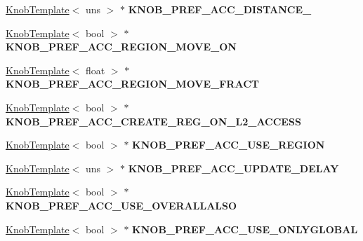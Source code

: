 \begin{DoxyCompactItemize}
\item 
\hypertarget{classall__knobs__c_acaf4e18cdefbbba18ee13f93cdf1183a}{
\hyperlink{classKnobTemplate}{KnobTemplate}$<$ uns $>$ $\ast$ {\bfseries KNOB\_\-PREF\_\-ACC\_\-DISTANCE\_}}
\label{classall__knobs__c_acaf4e18cdefbbba18ee13f93cdf1183a}

\item 
\hypertarget{classall__knobs__c_a97ea3ca4625d5f82c295c829c79321f5}{
\hyperlink{classKnobTemplate}{KnobTemplate}$<$ bool $>$ $\ast$ {\bfseries KNOB\_\-PREF\_\-ACC\_\-REGION\_\-MOVE\_\-ON}}
\label{classall__knobs__c_a97ea3ca4625d5f82c295c829c79321f5}

\item 
\hypertarget{classall__knobs__c_a65a90faa1c2bae687c9150175d9d342a}{
\hyperlink{classKnobTemplate}{KnobTemplate}$<$ float $>$ $\ast$ {\bfseries KNOB\_\-PREF\_\-ACC\_\-REGION\_\-MOVE\_\-FRACT}}
\label{classall__knobs__c_a65a90faa1c2bae687c9150175d9d342a}

\item 
\hypertarget{classall__knobs__c_a8811e2e4ccf83541a0b230fbb4e11993}{
\hyperlink{classKnobTemplate}{KnobTemplate}$<$ bool $>$ $\ast$ {\bfseries KNOB\_\-PREF\_\-ACC\_\-CREATE\_\-REG\_\-ON\_\-L2\_\-ACCESS}}
\label{classall__knobs__c_a8811e2e4ccf83541a0b230fbb4e11993}

\item 
\hypertarget{classall__knobs__c_a744517befd51c2aead5394b86d8e40b7}{
\hyperlink{classKnobTemplate}{KnobTemplate}$<$ bool $>$ $\ast$ {\bfseries KNOB\_\-PREF\_\-ACC\_\-USE\_\-REGION}}
\label{classall__knobs__c_a744517befd51c2aead5394b86d8e40b7}

\item 
\hypertarget{classall__knobs__c_ae4b7652b704d9cac513e688e683a025b}{
\hyperlink{classKnobTemplate}{KnobTemplate}$<$ uns $>$ $\ast$ {\bfseries KNOB\_\-PREF\_\-ACC\_\-UPDATE\_\-DELAY}}
\label{classall__knobs__c_ae4b7652b704d9cac513e688e683a025b}

\item 
\hypertarget{classall__knobs__c_a77355816fc7ce20cd1c62643fea34262}{
\hyperlink{classKnobTemplate}{KnobTemplate}$<$ bool $>$ $\ast$ {\bfseries KNOB\_\-PREF\_\-ACC\_\-USE\_\-OVERALLALSO}}
\label{classall__knobs__c_a77355816fc7ce20cd1c62643fea34262}

\item 
\hypertarget{classall__knobs__c_aa87376b02a1c3127c9d5e1567af585d9}{
\hyperlink{classKnobTemplate}{KnobTemplate}$<$ bool $>$ $\ast$ {\bfseries KNOB\_\-PREF\_\-ACC\_\-USE\_\-ONLYGLOBAL}}
\label{classall__knobs__c_aa87376b02a1c3127c9d5e1567af585d9}


\end{DoxyCompactItemize}
